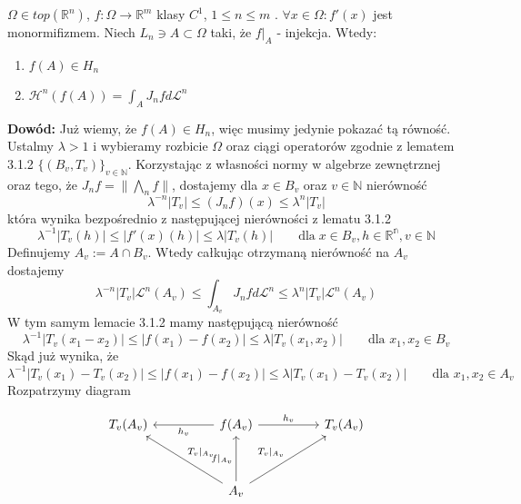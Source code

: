 \begin{tw}
	$\Omega \in top(\mathbb{R}^n)$, $f: \Omega \rightarrow \mathbb{R}^m$ klasy $C^1$, $1 \leq n \leq m$ . $\forall x \in \Omega: f'(x)$ jest monormifizmem. Niech $L_n \ni A \subset \Omega$ taki, że $f|_A$ - injekcja. Wtedy:
	\begin{enumerate}	
		\item $f(A) \in H_n$
		\item $\mathcal{H}^n(f(A)) = \int_A J_nfd \mathcal{L}^n$ 
	\end{enumerate}
	
	\textbf{Dowód:}\newline
	Już wiemy, że $f(A) \in H_n$, więc musimy jedynie pokazać tą równość. Ustalmy $\lambda > 1$ i wybieramy rozbicie $\Omega$ oraz ciągi operatorów zgodnie z lematem 3.1.2 $\{(B_v, T_v)\}_{v \in \mathbb{N}}$. Korzystając z własności normy w algebrze zewnętrznej oraz tego, że $J_nf = \|\bigwedge_nf\|$, dostajemy dla $x \in B_v$ oraz $v \in \mathbb{N}$ nierówność 
	$$
		\lambda^{-n}|T_v| \leq (J_nf)(x) \leq \lambda^n|T_v|
	$$
	która wynika bezpośrednio z następującej nierówności z lematu 3.1.2 
	$$
		\lambda^{-1}|T_v(h)| \leq |f'(x)(h)| \leq \lambda|T_v(h)| \quad\quad  \text{dla} \; x \in B_v, h \in \mathbb{R^n}, v \in \mathbb{N}
	$$
	Definujemy $A_v := A \cap B_v$. Wtedy całkując otrzymaną nierówność na $A_v$ dostajemy $$
		\lambda^{-n}|T_v|\mathcal{L}^n(A_v) \leq \int_{A_v}J_nf d \mathcal{L}^n \leq \lambda^n |T_v| \mathcal{L}^n(A_v)
	$$
	W tym samym lemacie 3.1.2 mamy następującą nierówność $$
		\lambda^{-1}|T_v(x_1 - x_2)| \leq |f(x_1) - f(x_2)| \leq \lambda |T_v(x_1, x_2)| \quad \quad \text{dla } x_1,x_2 \in B_v  
	$$
	Skąd już wynika, że $$
		\lambda^{-1}|T_v(x_1) - T_v(x_2)| \leq |f(x_1) - f(x_2)| \leq \lambda|T_v(x_1) - T_v(x_2)| \quad \quad \text{dla } x_1, x_2 \in A_v
	$$
	Rozpatrzymy diagram

	$$
	\begin{tikzcd}
		T_v(A_v) &    & f(A_v) \arrow[ll, "h_v"] \arrow[rr, "h_v"]                                               &  & T_v(A_v) \\
				&     &                                                                                   &  &          \\
				&     & A_v \arrow[lluu, "T_v|_{A_v}"'] \arrow[rruu, "T_v|_{A_v}"] \arrow[uu, "f|_{A_v}"] &  &         
	\end{tikzcd}
	$$




\end{tw}
